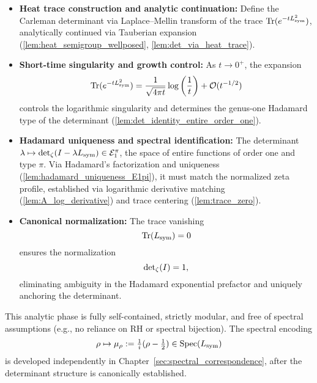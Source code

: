 \begin{itemize}
  \item \textbf{Heat trace construction and analytic continuation:} Define the Carleman determinant via Laplace--Mellin transform of the trace \( \operatorname{Tr}(e^{-t L_{\mathrm{sym}}^2}) \), analytically continued via Tauberian expansion (\cref{lem:heat_semigroup_wellposed}, \cref{lem:det_via_heat_trace}).

  \item \textbf{Short-time singularity and growth control:} As \( t \to 0^+ \), the expansion
  \[
  \operatorname{Tr}(e^{-t L_{\mathrm{sym}}^2}) = \frac{1}{\sqrt{4\pi t}} \log\left(\frac{1}{t}\right) + \mathcal{O}(t^{-1/2})
  \]
  controls the logarithmic singularity and determines the genus-one Hadamard type of the determinant (\cref{lem:det_identity_entire_order_one}).

  \item \textbf{Hadamard uniqueness and spectral identification:} The determinant \( \lambda \mapsto \det\nolimits_{\zeta}(I - \lambda L_{\mathrm{sym}}) \in \mathcal{E}_1^\pi \), the space of entire functions of order one and type \( \pi \). Via Hadamard's factorization and uniqueness (\cref{lem:hadamard_uniqueness_E1pi}), it must match the normalized zeta profile, established via logarithmic derivative matching (\cref{lem:A_log_derivative}) and trace centering (\cref{lem:trace_zero}).

  \item \textbf{Canonical normalization:} The trace vanishing
  \[
  \operatorname{Tr}(L_{\mathrm{sym}}) = 0
  \]
  ensures the normalization
  \[
  \det\nolimits_{\zeta}(I) = 1,
  \]
  eliminating ambiguity in the Hadamard exponential prefactor and uniquely anchoring the determinant.
\end{itemize}

\medskip

This analytic phase is fully self-contained, strictly modular, and free of spectral assumptions (e.g., no reliance on RH or spectral bijection). The spectral encoding
\[
\rho \mapsto \mu_\rho := \tfrac{1}{i}(\rho - \tfrac{1}{2}) \in \operatorname{Spec}(L_{\mathrm{sym}})
\]
is developed independently in Chapter~\ref{sec:spectral_correspondence}, after the determinant structure is canonically established.
